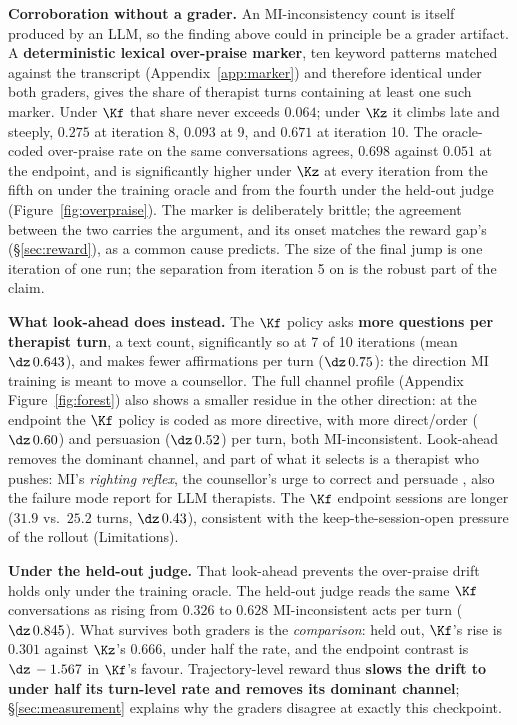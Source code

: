\textbf{Corroboration without a grader.} An MI-inconsistency count is itself produced by an
LLM, so the finding above could in principle be a grader artifact. A \textbf{deterministic lexical
over-praise marker}, ten keyword patterns matched against the transcript
(Appendix~\ref{app:marker}) and therefore identical under both graders, gives the share of
therapist turns containing at least one such marker. Under $\Kf$ that share never exceeds
$0.064$; under $\Kz$ it climbs late and steeply, $0.275$ at iteration 8, $0.093$ at 9, and
$\mathbf{0.671}$ at iteration 10. The oracle-coded over-praise rate on the same conversations
agrees, $0.698$ against $0.051$ at the endpoint, and is significantly higher under $\Kz$ at every
iteration from the fifth on under the training oracle and from the fourth under the held-out judge
(Figure~\ref{fig:overpraise}). The marker is deliberately brittle; the agreement between the two
carries the argument, and its onset matches the reward gap's (\S\ref{sec:reward}), as a common
cause predicts. The size of the final jump is one iteration of one run; the separation from
iteration 5 on is the robust part of the claim.

\textbf{What look-ahead does instead.} The $\Kf$ policy asks \textbf{more questions per therapist
turn}, a text count, significantly so at 7 of 10 iterations (mean $\dz\,0.643$), and makes fewer
affirmations per turn ($\dz\,0.75$): the direction MI training is meant to move a counsellor. The
full channel profile (Appendix Figure~\ref{fig:forest}) also shows a smaller residue in the other
direction: at the endpoint the $\Kf$ policy is coded as more directive, with more direct/order
($\dz\,0.60$) and persuasion ($\dz\,0.52$) per turn, both MI-inconsistent. Look-ahead removes
the dominant channel, and part of what it selects is a therapist who pushes: MI's \emph{righting
reflex}, the counsellor's urge to correct and persuade \citep{miller2013mi}, also the failure mode
\citet{chiu2024bolt} report for LLM therapists. The $\Kf$ endpoint sessions are longer ($31.9$
vs.\ $25.2$ turns, $\dz\,0.43$), consistent with the keep-the-session-open pressure of the
rollout (Limitations).

\textbf{Under the held-out judge.}
\label{sec:behaviour-heldout}
That look-ahead prevents the over-praise drift holds only under the training oracle. The held-out
judge reads the same $\Kf$ conversations as rising from $0.326$ to $0.628$ MI-inconsistent acts
per turn ($\dz\,0.845$). What survives both graders is the \emph{comparison}: held out, $\Kf$'s
rise is $0.301$ against $\Kz$'s $0.666$, under half the rate, and the endpoint contrast is
$\dz\,-1.567$ in $\Kf$'s favour. Trajectory-level reward thus \textbf{slows the drift to under
half its turn-level rate and removes its dominant channel}; \S\ref{sec:measurement} explains why
the graders disagree at exactly this checkpoint.
